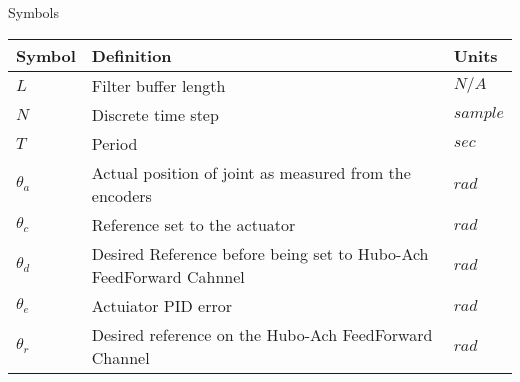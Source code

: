 \Large
\centering
Symbols\\
\normalsize
\begin{longtable}{p{} | p{} | p{}}
\hline
Symbol     & Definition                                                         & Units \\
\hline
$L$        & Filter buffer length                                               & $N/A$\\
\hline
$N$        & Discrete time step                                                 & $sample$\\
\hline
$T$        & Period                                                             & $sec$ \\
\hline
$\theta_a$ & Actual position of joint as measured from the encoders             & $rad$ \\
\hline
$\theta_c$ & Reference set to the actuator                                      & $rad$ \\
\hline
$\theta_d$ & Desired Reference before being set to Hubo-Ach FeedForward Cahnnel & $rad$ \\
\hline
$\theta_e$ & Actuiator PID error                                                & $rad$ \\
\hline
$\theta_r$ & Desired reference on the Hubo-Ach FeedForward Channel              & $rad$ \\
\hline

\end{longtable}
